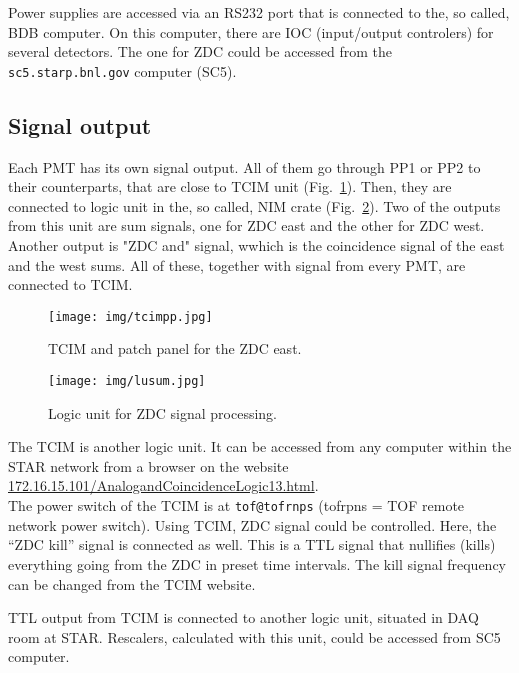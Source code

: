 Power supplies are accessed via an RS232 port that is connected to the, so called, BDB computer. On this computer, there are IOC (input/output controlers) for several detectors. The one for ZDC could be accessed from the \texttt{sc5.starp.bnl.gov} computer (SC5).

\subsection{Signal output}

Each PMT has its own signal output. All of them go through PP1 or PP2 to their counterparts, that are close to TCIM unit (Fig.~\ref{tcimpp}). Then, they are connected to logic unit in the, so called, NIM crate (Fig.~\ref{lu_sum}). Two of the outputs from this unit are sum signals, one for ZDC east and the other for ZDC west. Another output is "ZDC and" signal, wwhich is the coincidence signal of the east and the west sums. All of these, together with signal from every PMT, are connected to TCIM.

\begin{figure}[htb]
\begin{center}
\texttt{[image: img/tcimpp.jpg]}
\end{center}
\caption{TCIM and patch panel for the ZDC east.}
\label{tcimpp}
\end{figure}


\begin{figure}[htb]
\begin{center}
\texttt{[image: img/lusum.jpg]}
\end{center}
\caption{Logic unit for ZDC signal processing.}
\label{lu_sum}
\end{figure}

The TCIM is another logic unit.  It can be accessed from any  computer within the STAR network
from a browser on the website\\ 
\url{172.16.15.101/AnalogandCoincidenceLogic13.html}.\\
The power switch of the TCIM is at \texttt{tof@tofrnps} (tofrpns = TOF remote network power switch).
Using TCIM, ZDC signal could be controlled. Here, the ``ZDC kill'' signal is connected as well. This is a TTL signal that nullifies (kills) everything going from the ZDC in preset time intervals. The
kill signal frequency can be changed from the TCIM website.

TTL output from TCIM is connected to another logic unit, situated in DAQ room at STAR. Rescalers, calculated with this unit, could be accessed from SC5 computer.

